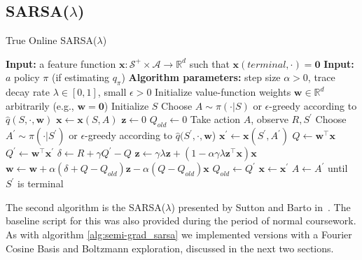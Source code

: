 \documentclass[journal]{IEEEtran}
\begin{document}
\subsection[SARSA(Lambda)]{SARSA($\lambda$)}

\begin{algorithm}
    \caption{True Online SARSA(\(\lambda\))~\cite{sutton2018}}
    \label{alg:lambda_sarsa}
    \begin{algorithmic}\small
      \State \textbf{Input:} a feature function \(\mathbf{x}:\mathcal{S}^+\times\mathcal{A}
        \rightarrow\mathbb{R}^d\) such that \(\mathbf{x}(terminal,\cdot)=\mathbf{0}\)
      \State \textbf{Input:} \(a\) policy \(\pi\) (if estimating \(q_\pi\)) 
      \State \textbf{Algorithm parameters:} step size \(\alpha>0\),
      \State \quad trace decay rate \(\lambda\in[0,1]\), small \(\epsilon>0\)
      \State Initialize value-function weights \(\mathbf{w} \in \mathbb{R}^d\) arbitrarily 
          (e.g., \(\mathbf{w} = \mathbf{0}\)) 
        \State Initialize \(S\)
        \State Choose \(A\sim\pi(\cdot|S)\) or \(\epsilon\)-greedy according to 
            \(\hat{q}(S,\cdot,\mathbf{w})\)
        \State \(\mathbf{x} \leftarrow \mathbf{x}(S, A) \)
        \State \(\mathbf{z} \leftarrow 0\)
        \State \(Q_{old} \leftarrow 0\)
          \State Take action \(A\), observe \(R,S^\prime\)
          \State Choose \(A^\prime\sim\pi(\cdot|S^\prime)\) or \(\epsilon\)-greedy according to 
            \(\hat{q}(S^\prime,\cdot,\mathbf{w}\))
          \State \(\mathbf{x}^\prime \leftarrow \mathbf{x}(S^\prime,A^\prime)\)
          \State \(Q \leftarrow \mathbf{w}^\top\mathbf{x}\)
          \State \(Q^\prime \leftarrow \mathbf{w}^\top\mathbf{x}^\prime\)
          \State \(\delta \leftarrow R + \gamma Q^\prime - Q\)
          \State \(\mathbf{z} \leftarrow \gamma\lambda\mathbf{z} + (1-\alpha\gamma\lambda\mathbf{z}^\top\mathbf{x})\mathbf{x}\)
          \State \(\mathbf{w} \leftarrow \mathbf{w} + \alpha(\delta + Q - Q_{old})\mathbf{z} -\alpha(Q-Q_{old})\mathbf{x}\)
          \State \(Q_{old} \leftarrow Q^\prime\)
          \State \(\mathbf{x} \leftarrow \mathbf{x}^\prime\)
          \State \(A \leftarrow A^\prime\)
        \EndFor
        \State until \(S^\prime\) is terminal
      \EndFor
    \end{algorithmic}
\end{algorithm}

The second algorithm is the SARSA(\(\lambda\)) presented by Sutton and Barto in~\cite{sutton2018}.
The baseline script for this was also provided during the period of normal coursework.
As with algorithm \ref{alg:semi-grad_sarsa} we implemented versions with a Fourier Cosine Basis
and Boltzmann exploration, discussed in the next two sections.
\end{document}
